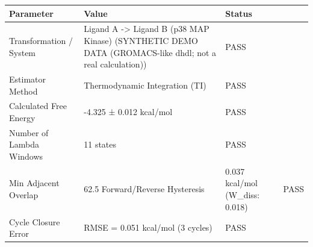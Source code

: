 \begin{tabular}{lll}
\toprule
Parameter & Value & Status \\
\midrule
Transformation / System & Ligand A -> Ligand B (p38 MAP Kinase) (SYNTHETIC DEMO DATA (GROMACS-like dhdl; not a real calculation)) & PASS \\
Estimator Method & Thermodynamic Integration (TI) & PASS \\
Calculated Free Energy & -4.325 ± 0.012 kcal/mol & PASS \\
Number of Lambda Windows & 11 states & PASS \\
Min Adjacent Overlap & 62.5%
Forward/Reverse Hysteresis & 0.037 kcal/mol (W_diss: 0.018) & PASS \\
Cycle Closure Error & RMSE = 0.051 kcal/mol (3 cycles) & PASS \\
\bottomrule
\end{tabular}
